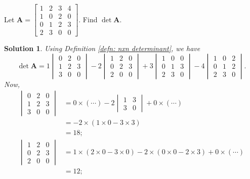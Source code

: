 \documentclass[]{book}
\newcommand{\mat}[1]{\ensuremath{\mathbf{#1}}}
\newtheorem*{solution}{Solution}
\begin{document}
\begin{example}
    \label{expl: finding determinant for 4x4 matrix}
    Let $\mat{A} = \begin{bmatrix}1 & 2 & 3 & 4 \\ 1 & 0 & 2 & 0  \\ 0 & 1 & 2 & 3 \\ 2 & 3 & 0 & 0\end{bmatrix}$. Find $\det\mat{A}$.
\begin{solution}
    Using Definition \ref{defn: nxn determinant}, we have
    \[\det\mat{A} = 
    1\begin{vmatrix}0 & 2 & 0 \\ 1 & 2 & 3 \\ 3 & 0 & 0\end{vmatrix}
    - 2\begin{vmatrix}1 & 2 & 0 \\ 0 & 2 & 3 \\ 2 & 0 & 0\end{vmatrix}
    +3 \begin{vmatrix}1 & 0 & 0 \\ 0 & 1 & 3 \\ 2 & 3 & 0\end{vmatrix}
    - 4\begin{vmatrix} 1 & 0 & 2 \\ 0 & 1 & 2 \\ 2 & 3 & 0\end{vmatrix}.\]
    Now,
    \begin{align*}
        \begin{vmatrix}0 & 2 & 0 \\ 1 & 2 & 3 \\ 3 & 0 & 0\end{vmatrix} &= 0\times(\cdots) - 2\begin{vmatrix}1 & 3 \\ 3 & 0\end{vmatrix} + 0\times(\cdots) \\
        &= -2 \times (1 \times 0 - 3 \times 3) \\
        &= 18; \\
        \begin{vmatrix}1 & 2 & 0 \\ 0 & 2 & 3 \\ 2 & 0 & 0\end{vmatrix} &= 1 \times (2 \times 0 - 3 \times 0) - 2 \times (0 \times 0 - 2 \times 3) + 0 \times (\cdots) \\
        &= 12; \\

\end{align*}
\end{solution}
\end{example}
\end{document}
